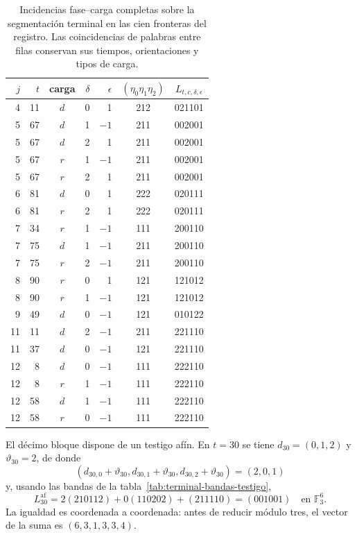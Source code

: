 \begin{table}[htbp]
\centering\small
\begin{tabular}{rrcrrc c}
\toprule
$j$&$t$&carga&$\delta$&$\epsilon$&$(\eta_0\eta_1\eta_2)$&$L_{t,c,\delta,\epsilon}$\\
\midrule
4&11&$d$&0& 1&212&021101\\
5&67&$d$&1&$-1$&211&002001\\
5&67&$d$&2& 1&211&002001\\
5&67&$r$&1&$-1$&211&002001\\
5&67&$r$&2& 1&211&002001\\
6&81&$d$&0& 1&222&020111\\
6&81&$r$&2& 1&222&020111\\
7&34&$r$&1&$-1$&111&200110\\
7&75&$d$&1&$-1$&211&200110\\
7&75&$r$&2&$-1$&211&200110\\
8&90&$r$&0& 1&121&121012\\
8&90&$r$&1&$-1$&121&121012\\
9&49&$d$&0&$-1$&121&010122\\
11&11&$d$&2&$-1$&211&221110\\
11&37&$d$&0&$-1$&121&221110\\
12&8&$d$&0&$-1$&111&222110\\
12&8&$r$&1&$-1$&111&222110\\
12&58&$d$&1&$-1$&111&222110\\
12&58&$r$&0&$-1$&111&222110\\
\bottomrule
\end{tabular}
\caption{Incidencias fase--carga completas sobre la segmentación terminal
en las cien fronteras del registro. Las coincidencias de palabras entre
filas conservan sus tiempos, orientaciones y tipos de carga.}
\label{tab:terminal-incidencias-completas}
\end{table}

El décimo bloque dispone de un testigo afín. En $t=30$ se tiene
$d_{30}=(0,1,2)$ y $\vartheta_{30}=2$, de donde
\[
 (d_{30,0}+\vartheta_{30},d_{30,1}+\vartheta_{30},
 d_{30,2}+\vartheta_{30})=(2,0,1)
\]
y, usando las bandas de la tabla~\ref{tab:terminal-bandas-testigo},
\[
 L^{\mathrm{af}}_{30}
 =2(210112)+0(110202)+(211110)
 =(001001)\quad\text{en }\mathbb F_3^6.
\]
La igualdad es coordenada a coordenada: antes de reducir módulo tres,
el vector de la suma es $(6,3,1,3,3,4)$.

